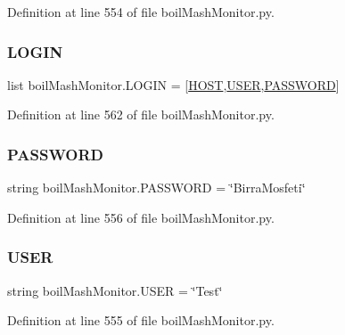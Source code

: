 Definition at line 554 of file boil\+Mash\+Monitor.\+py.

\mbox{\label{namespaceboil_mash_monitor_a8408c26ef74bdfc75af04aba577b439d}} 
\subsubsection{\texorpdfstring{LOGIN}{LOGIN}}
{\footnotesize\ttfamily list boil\+Mash\+Monitor.\+L\+O\+G\+IN = \mbox{[}\mbox{\hyperlink{namespaceboil_mash_monitor_aaf393e03ba47fb4d4cd4da6a0b885b6f}{H\+O\+ST}},\mbox{\hyperlink{namespaceboil_mash_monitor_aef5bd2fb4e6848fe82bf144234159d3a}{U\+S\+ER}},\mbox{\hyperlink{namespaceboil_mash_monitor_a58770b0ee81ebb75662253e7c03d40d9}{P\+A\+S\+S\+W\+O\+RD}}\mbox{]}}



Definition at line 562 of file boil\+Mash\+Monitor.\+py.

\mbox{\label{namespaceboil_mash_monitor_a58770b0ee81ebb75662253e7c03d40d9}} 
\subsubsection{\texorpdfstring{PASSWORD}{PASSWORD}}
{\footnotesize\ttfamily string boil\+Mash\+Monitor.\+P\+A\+S\+S\+W\+O\+RD = \char`\"{}Birra\+Mosfeti\char`\"{}}



Definition at line 556 of file boil\+Mash\+Monitor.\+py.

\mbox{\label{namespaceboil_mash_monitor_aef5bd2fb4e6848fe82bf144234159d3a}} 
\subsubsection{\texorpdfstring{USER}{USER}}
{\footnotesize\ttfamily string boil\+Mash\+Monitor.\+U\+S\+ER = \char`\"{}Test\char`\"{}}



Definition at line 555 of file boil\+Mash\+Monitor.\+py.

